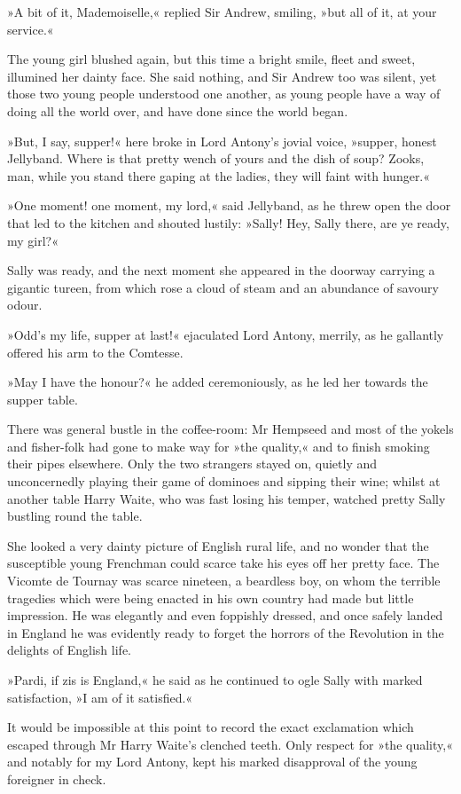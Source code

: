 »A bit of it, Mademoiselle,« replied Sir Andrew, smiling, »but all of it, at your service.«

The young girl blushed again, but this time a bright smile, fleet and sweet, illumined her dainty face. She said nothing, and Sir Andrew too was silent, yet those two young people understood one another, as young people have a way of doing all the world over, and have done since the world began.

»But, I say, supper!« here broke in Lord Antony's jovial voice, »supper, honest Jellyband. Where is that pretty wench of yours and the dish of soup? Zooks, man, while you stand there gaping at the ladies, they will faint with hunger.«

»One moment! one moment, my lord,« said Jellyband, as he threw open the door that led to the kitchen and shouted lustily: »Sally! Hey, Sally there, are ye ready, my girl?«

Sally was ready, and the next moment she appeared in the doorway carrying a gigantic tureen, from which rose a cloud of steam and an abundance of savoury odour.

»Odd's my life, supper at last!« ejaculated Lord Antony, merrily, as he gallantly offered his arm to the Comtesse.

»May I have the honour?« he added ceremoniously, as he led her towards the supper table.

There was general bustle in the coffee-room: Mr Hempseed and most of the yokels and fisher-folk had gone to make way for »the quality,« and to finish smoking their pipes elsewhere. Only the two strangers stayed on, quietly and unconcernedly playing their game of dominoes and sipping their wine; whilst at another table Harry Waite, who was fast losing his temper, watched pretty Sally bustling round the table.

She looked a very dainty picture of English rural life, and no wonder that the susceptible young Frenchman could scarce take his eyes off her pretty face. The Vicomte de Tournay was scarce nineteen, a beardless boy, on whom the terrible tragedies which were being enacted in his own country had made but little impression. He was elegantly and even foppishly dressed, and once safely landed in England he was evidently ready to forget the horrors of the Revolution in the delights of English life.

»Pardi, if zis is England,« he said as he continued to ogle Sally with marked satisfaction, »I am of it satisfied.«

It would be impossible at this point to record the exact exclamation which escaped through Mr Harry Waite's clenched teeth. Only respect for »the quality,« and notably for my Lord Antony, kept his marked disapproval of the young foreigner in check.

